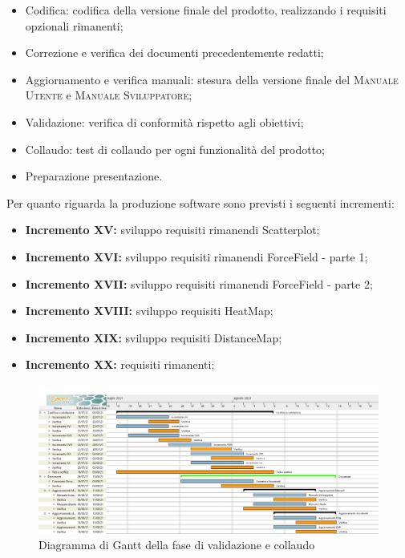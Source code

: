 \documentclass[../piano_di_progetto.tex]{subfiles}
\begin{document}
\begin{itemize}
    \item Codifica: codifica della versione finale del prodotto, realizzando i requisiti opzionali rimanenti;
    \item Correzione e verifica dei documenti precedentemente redatti;
    \item Aggiornamento e verifica manuali: stesura della versione finale del \textsc{Manuale Utente} e \textsc{Manuale Sviluppatore};
    \item Validazione: verifica di conformità rispetto agli obiettivi;
    \item Collaudo: test di collaudo per ogni funzionalità del prodotto;
    \item Preparazione presentazione.
\end{itemize}

Per quanto riguarda la produzione software sono previsti i seguenti incrementi:
\begin{itemize}
    \item \textbf{Incremento XV:} sviluppo requisiti rimanendi Scatterplot;
    \item \textbf{Incremento XVI:} sviluppo requisiti rimanendi ForceField - parte 1;
    \item \textbf{Incremento XVII:} sviluppo requisiti rimanendi ForceField - parte 2;
    \item \textbf{Incremento XVIII:} sviluppo requisiti HeatMap;
    \item \textbf{Incremento XIX:} sviluppo requisiti DistanceMap;
    \item \textbf{Incremento XX:} requisiti rimanenti;
\end{itemize}


\begin{figure}[H]
\centering
\includegraphics[width=18cm]{src/img/gantt/pianif_RA.jpg}
\caption{Diagramma di Gantt della fase di validazione e collaudo}
\end{figure}
\end{document}
